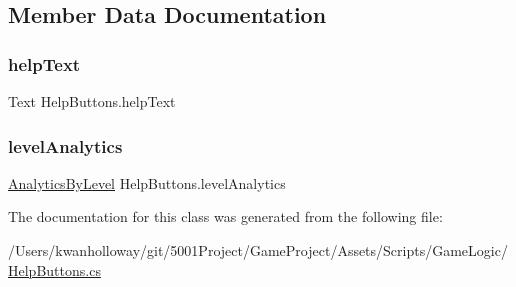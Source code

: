 \subsection{Member Data Documentation}
\mbox{\label{class_help_buttons_ab183c5e89514936aac4fdb0fb27d3ba3}} 
\subsubsection{\texorpdfstring{help\+Text}{helpText}}
{\footnotesize\ttfamily Text Help\+Buttons.\+help\+Text}

\mbox{\label{class_help_buttons_ad47263338c2ea5515badf5dc8a8bb18b}} 
\subsubsection{\texorpdfstring{level\+Analytics}{levelAnalytics}}
{\footnotesize\ttfamily \hyperlink{class_analytics_by_level}{Analytics\+By\+Level} Help\+Buttons.\+level\+Analytics}



The documentation for this class was generated from the following file\+:\begin{DoxyCompactItemize}
\item 
/\+Users/kwanholloway/git/5001\+Project/\+Game\+Project/\+Assets/\+Scripts/\+Game\+Logic/\hyperlink{_help_buttons_8cs}{Help\+Buttons.\+cs}\end{DoxyCompactItemize}
